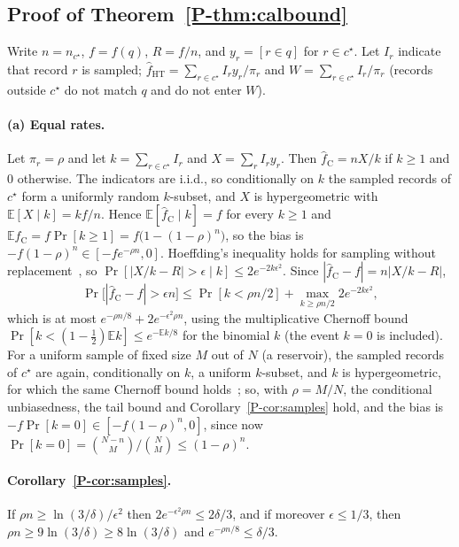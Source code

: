 \documentclass[sigconf,review,anonymous]{acmart}
\newcommand{\E}{\mathbb{E}}
\newcommand{\pref}[1]{\ref{P-#1}}
\begin{document}
\subsection{Proof of Theorem~\pref{thm:calbound}}

Write $n=n_{c^\star}$, $f=f(q)$, $R=f/n$, and $y_r=[r\in q]$ for $r\in c^\star$. Let $I_r$ indicate that
record $r$ is sampled; $\hat f_{\mathrm{HT}}=\sum_{r\in c^\star}I_ry_r/\pi_r$ and
$W=\sum_{r\in c^\star}I_r/\pi_r$ (records outside $c^\star$ do not match $q$ and do not enter $W$).

\paragraph{(a) Equal rates.} Let $\pi_r=\rho$ and let $k=\sum_{r\in c^\star}I_r$ and $X=\sum_rI_ry_r$.
Then $\hat f_{\mathrm C}=nX/k$ if $k\ge1$ and $0$ otherwise. The indicators are i.i.d., so conditionally
on $k$ the sampled records of $c^\star$ form a uniformly random $k$-subset, and $X$ is hypergeometric with
$\E[X\mid k]=kf/n$. Hence $\E[\hat f_{\mathrm C}\mid k]=f$ for every $k\ge1$ and
$\E\hat f_{\mathrm C}=f\Pr[k\ge1]=f\bigl(1-(1-\rho)^n\bigr)$, so the bias is $-f(1-\rho)^n\in[-fe^{-\rho n},0]$.
Hoeffding's inequality holds for sampling without replacement~\cite[Thm.~4]{hoeffding}, so
$\Pr[|X/k-R|>\epsilon\mid k]\le2e^{-2k\epsilon^2}$. Since $|\hat f_{\mathrm C}-f|=n|X/k-R|$,
\[
 \Pr\bigl[|\hat f_{\mathrm C}-f|>\epsilon n\bigr]\le\Pr[k<\rho n/2]+\max_{k\ge\rho n/2}2e^{-2k\epsilon^2},
\]
which is at most $e^{-\rho n/8}+2e^{-\epsilon^2\rho n}$,
using the multiplicative Chernoff bound $\Pr[k<(1-\frac12)\E k]\le e^{-\E k/8}$ for the binomial $k$
(the event $k=0$ is included). For a uniform sample of fixed size $M$ out of $N$ (a reservoir), the sampled
records of $c^\star$ are again, conditionally on $k$, a uniform $k$-subset, and $k$ is hypergeometric,
for which the same Chernoff bound holds~\cite{hoeffding}; so, with $\rho=M/N$, the conditional
unbiasedness, the tail bound and Corollary~\pref{cor:samples} hold, and the bias is
$-f\Pr[k=0]\in[-f(1-\rho)^n,0]$, since now $\Pr[k=0]=\binom{N-n}M/\binom NM\le(1-\rho)^n$.

\paragraph{Corollary~\pref{cor:samples}.} If $\rho n\ge\ln(3/\delta)/\epsilon^2$ then
$2e^{-\epsilon^2\rho n}\le2\delta/3$, and if moreover $\epsilon\le1/3$, then $\rho n\ge9\ln(3/\delta)\ge
8\ln(3/\delta)$ and $e^{-\rho n/8}\le\delta/3$.
\end{document}
